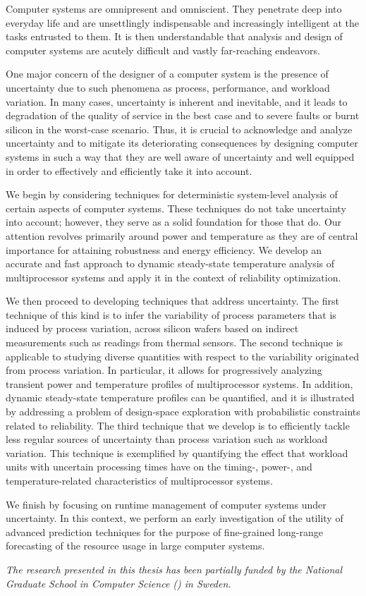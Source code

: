 Computer systems are omnipresent and omniscient. They penetrate deep into
everyday life and are unsettlingly indispensable and increasingly intelligent at
the tasks entrusted to them. It is then understandable that analysis and design
of computer systems are acutely difficult and vastly far-reaching endeavors.

One major concern of the designer of a computer system is the presence of
uncertainty due to such phenomena as process, performance, and workload
variation. In many cases, uncertainty is inherent and inevitable, and it leads
to degradation of the quality of service in the best case and to severe faults
or burnt silicon in the worst-case scenario. Thus, it is crucial to acknowledge
and analyze uncertainty and to mitigate its deteriorating consequences by
designing computer systems in such a way that they are well aware of uncertainty
and well equipped in order to effectively and efficiently take it into account.

We begin by considering techniques for deterministic system-level analysis of
certain aspects of computer systems. These techniques do not take uncertainty
into account; however, they serve as a solid foundation for those that do. Our
attention revolves primarily around power and temperature as they are of central
importance for attaining robustness and energy efficiency. We develop an
accurate and fast approach to dynamic steady-state temperature analysis of
multiprocessor systems and apply it in the context of reliability optimization.

We then proceed to developing techniques that address uncertainty. The first
technique of this kind is to infer the variability of process parameters that is
induced by process variation, across silicon wafers based on indirect
measurements such as readings from thermal sensors. The second technique is
applicable to studying diverse quantities with respect to the variability
originated from process variation. In particular, it allows for progressively
analyzing transient power and temperature profiles of multiprocessor systems. In
addition, dynamic steady-state temperature profiles can be quantified, and it is
illustrated by addressing a problem of design-space exploration with
probabilistic constraints related to reliability. The third technique that we
develop is to efficiently tackle less regular sources of uncertainty than
process variation such as workload variation. This technique is exemplified by
quantifying the effect that workload units with uncertain processing times have
on the timing-, power-, and temperature-related characteristics of
multiprocessor systems.

We finish by focusing on runtime management of computer systems under
uncertainty. In this context, we perform an early investigation of the utility
of advanced prediction techniques for the purpose of fine-grained long-range
forecasting of the resource usage in large computer systems.

\vspace{1em}
\noindent
\emph{The research presented in this thesis has been partially funded by the
National Graduate School in Computer Science () in Sweden.}
